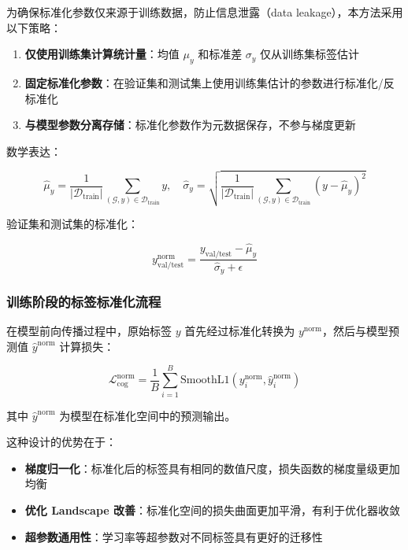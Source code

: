 为确保标准化参数仅来源于训练数据，防止信息泄露（data leakage），本方法采用以下策略：

\begin{enumerate}
    \item \textbf{仅使用训练集计算统计量}：均值 $\mu_y$ 和标准差 $\sigma_y$ 仅从训练集标签估计
    \item \textbf{固定标准化参数}：在验证集和测试集上使用训练集估计的参数进行标准化/反标准化
    \item \textbf{与模型参数分离存储}：标准化参数作为元数据保存，不参与梯度更新
\end{enumerate}

数学表达：

\begin{equation}
\hat{\mu}_y = \frac{1}{|\mathcal{D}_{\text{train}}|} \sum_{(\mathcal{G}, y) \in \mathcal{D}_{\text{train}}} y, \quad \hat{\sigma}_y = \sqrt{\frac{1}{|\mathcal{D}_{\text{train}}|} \sum_{(\mathcal{G}, y) \in \mathcal{D}_{\text{train}}} (y - \hat{\mu}_y)^2}
\end{equation}

验证集和测试集的标准化：

\begin{equation}
y_{\text{val/test}}^{\text{norm}} = \frac{y_{\text{val/test}} - \hat{\mu}_y}{\hat{\sigma}_y + \epsilon}
\end{equation}

\subsubsection{训练阶段的标签标准化流程}

在模型前向传播过程中，原始标签 $y$ 首先经过标准化转换为 $y^{\text{norm}}$，然后与模型预测值 $\hat{y}^{\text{norm}}$ 计算损失：

\begin{equation}
\mathcal{L}_{\text{cog}}^{\text{norm}} = \frac{1}{B} \sum_{i=1}^{B} \text{SmoothL1}\left(y_i^{\text{norm}}, \hat{y}_i^{\text{norm}}\right)
\end{equation}

其中 $\hat{y}^{\text{norm}}$ 为模型在标准化空间中的预测输出。

这种设计的优势在于：

\begin{itemize}
    \item \textbf{梯度归一化}：标准化后的标签具有相同的数值尺度，损失函数的梯度量级更加均衡
    \item \textbf{优化 Landscape 改善}：标准化空间的损失曲面更加平滑，有利于优化器收敛
    \item \textbf{超参数通用性}：学习率等超参数对不同标签具有更好的迁移性
\end{itemize}


